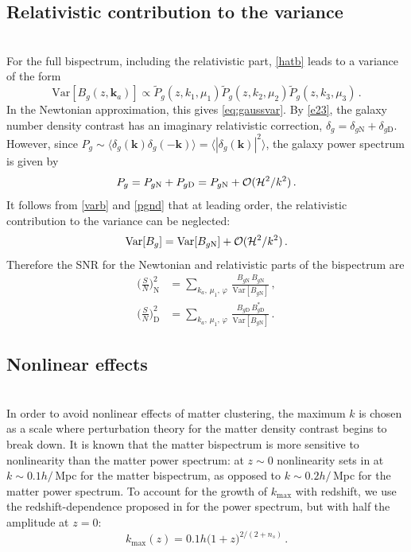 \subsection{{Relativistic contribution to the variance}}
~\\
{For the full bispectrum, including the relativistic part, \eqref{hatb}}
leads to a variance of the form 
\begin{equation} \label{varb}
{\mathrm{Var}} [{B_{g}}(z,\bm{k}_a)] \propto \tilde{P}_{g}(z,k_{1},\mu_{1}) \tilde{P}_{g}(z,k_{2},\mu_{2})\tilde{P}_{g}(z,k_{3},\mu_{3}) \,.
\end{equation}
In the Newtonian approximation, this gives \eqref{eq:gaussvar}. By \eqref{e23}, the galaxy number density contrast has an imaginary relativistic correction, $\delta_g=\delta_{g{\mathrm{N}}}+\delta_{g{\mathrm{D}}}$. However, since $P_g \sim\langle \delta_g(\bm{k}) \delta_g(\bm{-k})\rangle=\langle |\delta_g(\bm{k})|^2\rangle$, the galaxy power spectrum  is given by \cite{McDonald:2009dh,Abramo:2017xnp,Clarkson:2018dwn}
\begin{equation} \label{pgnd}
P_g= P_{g{\mathrm{N}}} + P_{g{\mathrm{D}}}=  P_{g{\mathrm{N}}}+ \mathcal{O}(\mathcal{H}^2/k^2) \,.
\end{equation}
 It follows from \eqref{varb} and \eqref{pgnd} that  at leading order, the relativistic contribution to the variance can be neglected:
\begin{equation}
{{\mathrm{Var}} [{B_{g}}] = {\mathrm{Var}} [{B_{g{\mathrm{N}}}}] + \mathcal{O}(\mathcal{H}^2/k^2)\,.}
\end{equation}
 Therefore the SNR for the Newtonian and relativistic parts of the bispectrum are
\begin{align}
\bigg(\frac{S}{N}\bigg)^{2}_{\mathrm{N}} &= 
\sum_{k_a,\,\mu_{1},\,\varphi}\, \frac{B_{g{\mathrm{N}}}\,B_{g{\mathrm{N}}}}{{{\mathrm{Var}} [{B_{g{\mathrm{N}}}}]}}\,,\label{e3a}\\
\bigg(\frac{S}{N}\bigg)^{2}_{\mathrm{D}} &= 
\sum_{k_a,\,\mu_{1},\,\varphi}\,\frac{B_{g{\mathrm{D}}}\,{B^*_{g{\mathrm{D}}}}}{{{\mathrm{Var}} [{B_{g{\mathrm{N}}}}]}}\,.\label{e3b}  
\end{align}
%
%
\subsection{{Nonlinear effects}} 
~\\

{In order to avoid nonlinear effects of matter clustering, the maximum  $k$ is chosen as a scale where perturbation theory for the matter density contrast begins to break down. It is known that the matter bispectrum is more sensitive to nonlinearity than the matter power spectrum: at $z\sim 0$ nonlinearity sets in at $k\sim 0.1h/\,$Mpc for the matter bispectrum, as opposed to $k\sim 0.2h/\,$Mpc for the matter power spectrum. To  account for the growth of $k_{\mathrm{max}}$ with redshift, we use the redshift-dependence proposed in \cite{Smith:2002dz} for the power spectrum, but with half the amplitude at $z=0$:}
\begin{equation}\label{kmax}
k_{\mathrm{max}}(z) = {0.1h}\big(1+z\big)^{2/(2+n_{s})}\,.
\end{equation}

